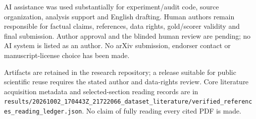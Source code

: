 \documentclass[10pt,a4paper,twocolumn]{article}
\begin{document}
AI assistance was used substantially for experiment/audit code, source organization, analysis support and English drafting. Human authors remain responsible for factual claims, references, data rights, gold/scorer validity and final submission. Author approval and the blinded human review are pending; no AI system is listed as an author. No arXiv submission, endorser contact or manuscript-license choice has been made.

Artifacts are retained in the research repository; a release suitable for public scientific reuse requires the stated author and data-rights review. Core literature acquisition metadata and selected-section reading records are in \texttt{results/20261002\_170443Z\_21722066\_dataset\_literature/verified\_references\_reading\_ledger.json}. No claim of fully reading every cited PDF is made.
\end{document}
